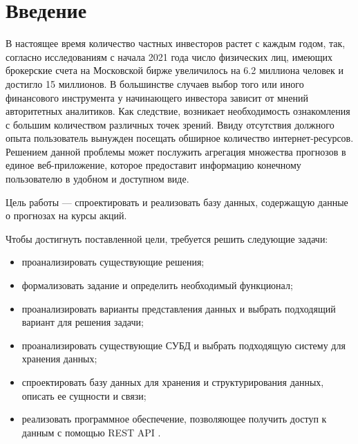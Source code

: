 \chapter*{Введение}

В настоящее время количество частных инвесторов растет с каждым годом, так, согласно исследованиям \cite{bib:5} с начала 2021 года число физических лиц, имеющих брокерские счета на Московской бирже увеличилось на 6.2 миллиона человек и достигло 15 миллионов. В большинстве случаев выбор того или иного финансового инструмента у начинающего инвестора зависит от мнений авторитетных аналитиков. Как следствие, возникает необходимость ознакомления с большим количеством различных точек зрений. Ввиду отсутствия должного опыта пользователь вынужден посещать обширное количество интернет-ресурсов. Решением данной проблемы может послужить агрегация множества прогнозов в единое веб-приложение, которое предоставит информацию конечному пользователю в удобном и доступном виде.

Цель работы --- спроектировать и реализовать базу данных, содержащую данные о прогнозах на курсы акций.

Чтобы достигнуть поставленной цели, требуется решить следующие задачи:

\begin{itemize}
    \item проанализировать существующие решения;
    \item формализовать задание и определить необходимый функционал;
    \item проанализировать варианты представления данных и выбрать подходящий вариант для решения задачи;
    \item проанализировать существующие СУБД и выбрать подходящую систему для хранения данных;
    \item спроектировать базу данных для хранения и структурирования данных, описать ее сущности и связи;
    \item реализовать программное обеспечение, позволяющее получить доступ к данным с помощью REST API \cite{bib:6}.
\end{itemize}
